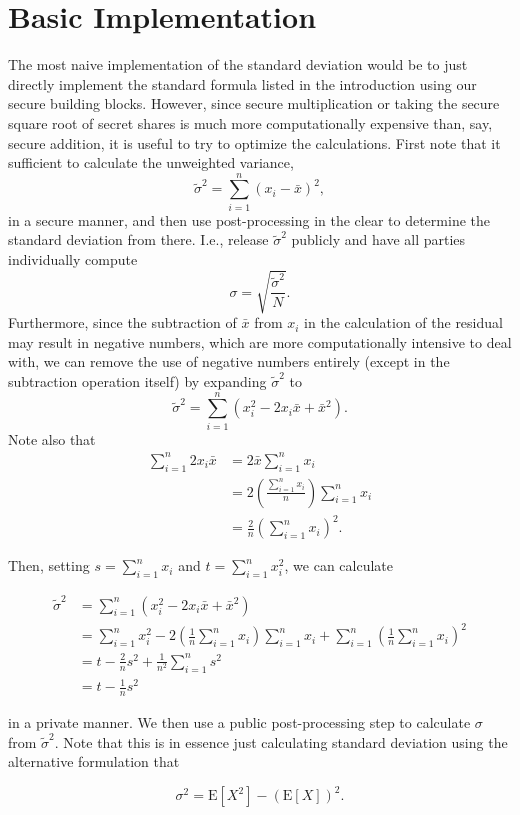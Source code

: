 \documentclass[11pt, oneside]{article}   	%
\begin{document}
\section{Basic Implementation}
The most naive implementation of the standard deviation would be to just directly implement the standard formula listed in the introduction using our secure building blocks. However, since secure multiplication or taking the secure square root of secret shares is much more computationally expensive than, say, secure addition, it is useful to try to optimize the calculations.
First note that it sufficient to calculate the unweighted variance, 
$$ \tilde{\sigma}^2 = \sum_{i=1}^n (x_i - \bar{x})^2, $$
in a secure manner, and then use post-processing in the clear to determine the standard deviation from there. I.e., release $\tilde{
\sigma}^2$ publicly and have all parties individually compute
$$ \sigma = \sqrt{\frac{\tilde{\sigma}^2}{N}}. $$ 
Furthermore, since the subtraction of $\bar{x}$ from $x_i$ in the calculation of the residual may result in negative numbers, which are more computationally intensive to deal with, we can remove the use of negative numbers entirely (except in the subtraction operation itself) by expanding $\tilde{\sigma}^2$ to
$$ \tilde{\sigma}^2 = \sum_{i=1}^n (x_i^2 -2x_i\bar{x} + \bar{x}^2). $$
Note also that
\begin{align*}
\sum_{i=1}^n 2 x_i \bar{x} &= 2 \bar{x} \sum_{i=1}^n x_i \\
	&= 2 \left(\frac{\sum_{i=1}^{n} x_i}{n}\right) \sum_{i=1}^n x_i \\
	&= \frac{2}{n} \left(\sum_{i=1}^n x_i\right)^2.
\end{align*}

Then, setting $s =  \sum_{i=1}^n x_i$ and $t =  \sum_{i=1}^n x_i^2$, we can calculate

\begin{align*}
\tilde{\sigma}^2 &= \sum_{i=1}^n (x_i^2 -2x_i\bar{x} + \bar{x}^2) \\
	&=  \sum_{i=1}^n x_i^2 - 2 \left(\frac{1}{n} \sum_{i=1}^n x_i\right)  \sum_{i=1}^n x_i + \sum_{i=1}^n \left(\frac{1}{n} \sum_{i=1}^n x_i \right)^2\\
	&= t -\frac{2}{n} s^2 + \frac{1}{n^2} \sum_{i=1}^n s^2 \\
	&= t - \frac{1}{n} s^2
\end{align*}

in a private manner. We then use a public post-processing step to calculate $\sigma$ from $\tilde{\sigma}^2$. Note that this is in essence just calculating standard deviation using the alternative formulation that 

$$ \sigma^2 = \text{E}[X^2] -(\text{E}[X])^2. $$
\end{document}
